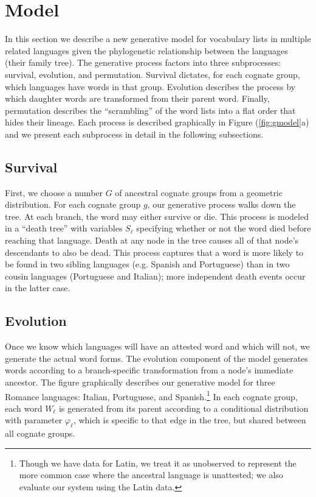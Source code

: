 \documentclass[11pt,a4paper]{article}
\begin{document}
\section{Model}

In this section we describe a new generative model for vocabulary
lists in multiple related languages given the phylogenetic relationship
between the languages (their family tree). The generative process
factors into three subprocesses: survival, evolution, and permutation.
Survival dictates, for each cognate group, which languages have
words in that group. Evolution describes the process by which
daughter words are transformed from their parent word. Finally,
permutation describes the ``scrambling'' of the word lists into a
flat order that hides their lineage. Each process is described
graphically in Figure (\ref{fig:gmodel}a) and we present each
subprocess in detail in the following subsections.

\subsection{Survival}

First, we choose a number $G$ of ancestral cognate groups from a
geometric distribution. For each cognate group $g$, our generative
process walks down the tree.  At each branch, the word may either
survive or die.  This process is modeled in a ``death tree'' with
variables $S_\ell$ specifying whether or not the word died before
reaching that language. Death at any node in the tree causes all
of that node's descendants to also be dead.  This process captures
that a word is more likely to be found in two sibling languages
(e.g. Spanish and Portuguese) than in two cousin languages (Portuguese
and Italian); more independent death events occur in the latter
case.

\subsection{Evolution}

Once we know which languages will have an attested word and which
will not, we generate the actual word forms. The evolution component of
the model generates words according to a branch-specific transformation
from a node's immediate ancestor.  The figure graphically describes
our generative model for three Romance languages: Italian, Portuguese,
and Spanish.\footnote{Though we have data for Latin, we treat it
as unobserved to represent the more common case where the ancestral
language is unattested; we also evaluate our system using the Latin
data.} In each cognate group, each word $W_\ell$ is generated from
its parent according to a conditional distribution with parameter
$\varphi_\ell$, which is specific to that edge in the tree, but
shared between all cognate groups.
\end{document}

